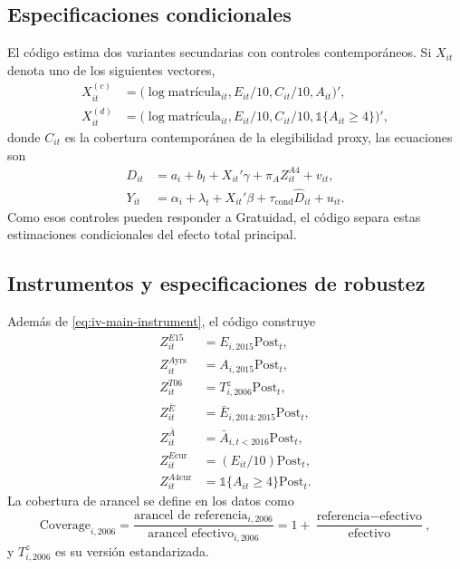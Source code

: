 \documentclass[11pt]{article}
\newcommand{\Post}{\mathrm{Post}}
\newcommand{\ind}{\mathbb{1}}
\begin{document}
\subsection{Especificaciones condicionales}

El código estima dos variantes secundarias con controles contemporáneos. Si
$X_{it}$ denota uno de los siguientes vectores,
\begin{align}
 X^{(c)}_{it}
 &=\bigl(\log \text{matrícula}_{it},E_{it}/10,C_{it}/10,A_{it}\bigr)', \\
 X^{(d)}_{it}
 &=\bigl(\log \text{matrícula}_{it},E_{it}/10,C_{it}/10,
          \ind\{A_{it}\geq4\}\bigr)',
\end{align}
donde $C_{it}$ es la cobertura contemporánea de la elegibilidad proxy, las
ecuaciones son
\begin{align}
 D_{it}
 &=a_i+b_t+X_{it}'\gamma+\pi_A Z^{A4}_{it}+v_{it},
 \label{eq:first-stage-controls}\\
 Y_{it}
 &=\alpha_i+\lambda_t+X_{it}'\beta
   +\tau_{\mathrm{cond}}\widehat D_{it}+u_{it}.
 \label{eq:second-stage-controls}
\end{align}
Como esos controles pueden responder a Gratuidad, el código separa estas
estimaciones condicionales del efecto total principal.

\subsection{Instrumentos y especificaciones de robustez}

Además de \eqref{eq:iv-main-instrument}, el código construye
\begin{align}
 Z^{E15}_{it}&=E_{i,2015}\Post_t, \\
 Z^{A\mathrm{yrs}}_{it}&=A_{i,2015}\Post_t, \\
 Z^{T06}_{it}&=T_{i,2006}^{z}\Post_t, \\
 Z^{\bar E}_{it}&=\bar E_{i,2014:2015}\Post_t, \\
 Z^{\bar A}_{it}&=\bar A_{i,t<2016}\Post_t, \\
 Z^{E\mathrm{cur}}_{it}&=(E_{it}/10)\Post_t, \\
 Z^{A4\mathrm{cur}}_{it}&=\ind\{A_{it}\geq4\}\Post_t.
\end{align}
La cobertura de arancel se define en los datos como
\begin{equation}
 \mathrm{Coverage}_{i,2006}
 =\frac{\text{arancel de referencia}_{i,2006}}
        {\text{arancel efectivo}_{i,2006}}
 =1+\frac{\text{referencia}-\text{efectivo}}
          {\text{efectivo}},
\end{equation}
y $T_{i,2006}^{z}$ es su versión estandarizada.
\end{document}
